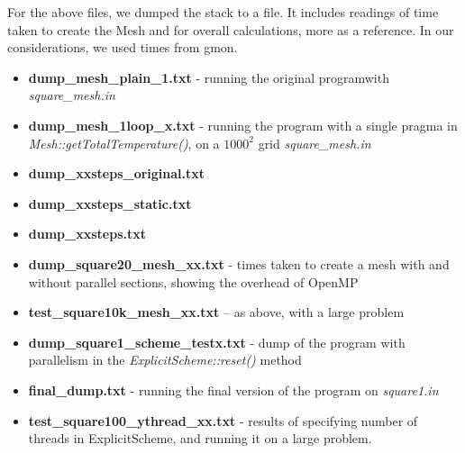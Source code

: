 \documentclass[11pt,journal]{IEEEtran}
\begin{document}
	For the above files, we dumped the stack to a file. It includes readings of time taken to create the Mesh and for overall calculations, more as a reference. In our considerations, we used times from gmon.
	\begin{itemize}
		\item \textbf{dump\_mesh\_plain\_1.txt} - running the original programwith \emph{square\_mesh.in}
		\item \textbf{dump\_mesh\_1loop\_x.txt} - running the program with a single pragma in \emph{Mesh::getTotalTemperature()}, on a $1000^2$ grid \emph{square\_mesh.in}
		\item \textbf{dump\_xxsteps\_original.txt} 
		\item \textbf{dump\_xxsteps\_static.txt}
		\item \textbf{dump\_xxsteps.txt}
		\item \textbf{dump\_square20\_mesh\_xx.txt} - times taken to create a mesh with and without parallel sections, showing the overhead of OpenMP
		\item \textbf{test\_square10k\_mesh\_xx.txt} -- as above, with a large problem
		\item \textbf{dump\_square1\_scheme\_testx.txt} - dump of the program with parallelism in the \emph{ExplicitScheme::reset()} method
		\item \textbf{final\_dump.txt} - running the final version of the program on \emph{square1.in}
		\item \textbf{test\_square100\_ythread\_xx.txt} - results of specifying number of threads in ExplicitScheme, and running it on a large problem.
		
	\end{itemize}


	
\end{document}
